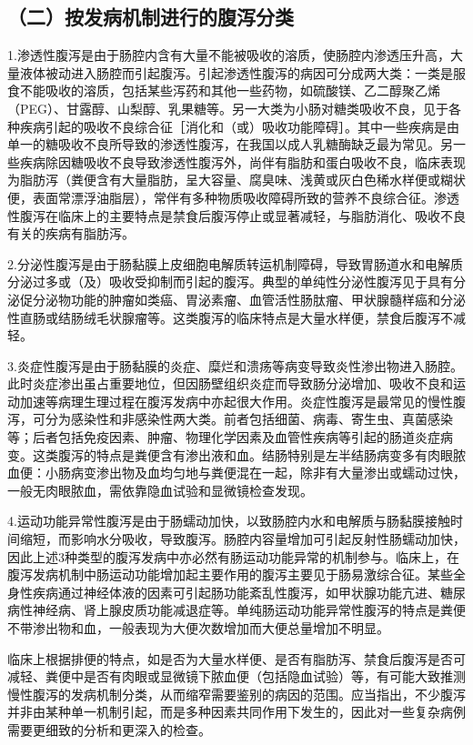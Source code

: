 \subsection{（二）按发病机制进行的腹泻分类}

1.渗透性腹泻是由于肠腔内含有大量不能被吸收的溶质，使肠腔内渗透压升高，大量液体被动进入肠腔而引起腹泻。引起渗透性腹泻的病因可分成两大类：一类是服食不能吸收的溶质，包括某些泻药和其他一些药物，如硫酸镁、乙二醇聚乙烯（PEG）、甘露醇、山梨醇、乳果糖等。另一大类为小肠对糖类吸收不良，见于各种疾病引起的吸收不良综合征［消化和（或）吸收功能障碍］。其中一些疾病是由单一的糖吸收不良所导致的渗透性腹泻，在我国以成人乳糖酶缺乏最为常见。另一些疾病除因糖吸收不良导致渗透性腹泻外，尚伴有脂肪和蛋白吸收不良，临床表现为脂肪泻（粪便含有大量脂肪，呈大容量、腐臭味、浅黄或灰白色稀水样便或糊状便，表面常漂浮油脂层），常伴有多种物质吸收障碍所致的营养不良综合征。渗透性腹泻在临床上的主要特点是禁食后腹泻停止或显著减轻，与脂肪消化、吸收不良有关的疾病有脂肪泻。

2.分泌性腹泻是由于肠黏膜上皮细胞电解质转运机制障碍，导致胃肠道水和电解质分泌过多或（及）吸收受抑制而引起的腹泻。典型的单纯性分泌性腹泻见于具有分泌促分泌物功能的肿瘤如类癌、胃泌素瘤、血管活性肠肽瘤、甲状腺髓样癌和分泌性直肠或结肠绒毛状腺瘤等。这类腹泻的临床特点是大量水样便，禁食后腹泻不减轻。

3.炎症性腹泻是由于肠黏膜的炎症、糜烂和溃疡等病变导致炎性渗出物进入肠腔。此时炎症渗出虽占重要地位，但因肠壁组织炎症而导致肠分泌增加、吸收不良和运动加速等病理生理过程在腹泻发病中亦起很大作用。炎症性腹泻是最常见的慢性腹泻，可分为感染性和非感染性两大类。前者包括细菌、病毒、寄生虫、真菌感染等；后者包括免疫因素、肿瘤、物理化学因素及血管性疾病等引起的肠道炎症病变。这类腹泻的特点是粪便含有渗出液和血。结肠特别是左半结肠病变多有肉眼脓血便：小肠病变渗出物及血均匀地与粪便混在一起，除非有大量渗出或蠕动过快，一般无肉眼脓血，需依靠隐血试验和显微镜检查发现。

4.运动功能异常性腹泻是由于肠蠕动加快，以致肠腔内水和电解质与肠黏膜接触时间缩短，而影响水分吸收，导致腹泻。肠腔内容量增加可引起反射性肠蠕动加快，因此上述3种类型的腹泻发病中亦必然有肠运动功能异常的机制参与。临床上，在腹泻发病机制中肠运动功能增加起主要作用的腹泻主要见于肠易激综合征。某些全身性疾病通过神经体液的因素可引起肠功能紊乱性腹泻，如甲状腺功能亢进、糖尿病性神经病、肾上腺皮质功能减退症等。单纯肠运动功能异常性腹泻的特点是粪便不带渗出物和血，一般表现为大便次数增加而大便总量增加不明显。

临床上根据排便的特点，如是否为大量水样便、是否有脂肪泻、禁食后腹泻是否可减轻、粪便中是否有肉眼或显微镜下脓血便（包括隐血试验）等，有可能大致推测慢性腹泻的发病机制分类，从而缩窄需要鉴别的病因的范围。应当指出，不少腹泻并非由某种单一机制引起，而是多种因素共同作用下发生的，因此对一些复杂病例需要更细致的分析和更深入的检查。

